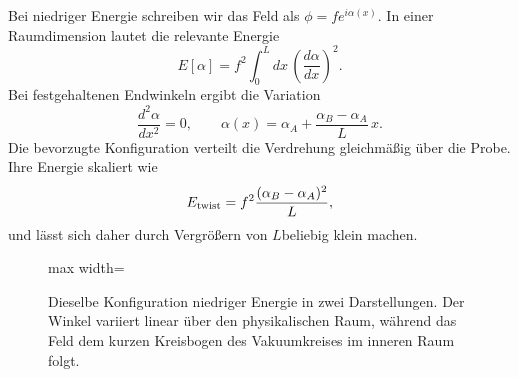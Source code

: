 Bei niedriger Energie schreiben wir das Feld als \(\phi=f e^{i\alpha(x)}\). In einer Raumdimension lautet die relevante Energie
\begin{equation}
  E[\alpha]
  =f^2\int_0^L dx\,\left(\frac{d\alpha}{dx}\right)^2.
  \label{eq:l07-angle-functional}
\end{equation}
Bei festgehaltenen Endwinkeln ergibt die Variation
\begin{equation}
  \frac{d^2\alpha}{dx^2}=0,
  \qquad
  \alpha(x)=\alpha_A+
    \frac{\alpha_B-\alpha_A}{L}\,x.
  \label{eq:l07-linear-twist}
\end{equation}
Die bevorzugte Konfiguration verteilt die Verdrehung gleichmäßig über die Probe. Ihre Energie skaliert wie
\begin{equation}
  E_{\rm twist}
  =f^2\frac{(\alpha_B-\alpha_A)^2}{L},
  \label{eq:l07-twist-energy}
\end{equation}
und lässt sich daher durch Vergrößern von \(L\)beliebig klein machen.

\begin{figure}[htbp]
\centering
\begin{adjustbox}{max width=\linewidth}
\end{adjustbox}
\caption{Dieselbe Konfiguration niedriger Energie in zwei Darstellungen. Der Winkel variiert linear über den physikalischen Raum, während das Feld dem kurzen Kreisbogen des Vakuumkreises im inneren Raum folgt.}
\end{figure}


